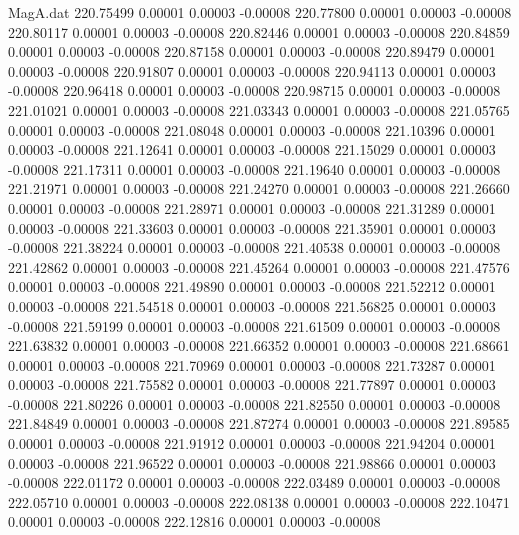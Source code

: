 \begin{filecontents}{MagA.dat}
 220.75499    0.00001    0.00003   -0.00008
 220.77800    0.00001    0.00003   -0.00008
 220.80117    0.00001    0.00003   -0.00008
 220.82446    0.00001    0.00003   -0.00008
 220.84859    0.00001    0.00003   -0.00008
 220.87158    0.00001    0.00003   -0.00008
 220.89479    0.00001    0.00003   -0.00008
 220.91807    0.00001    0.00003   -0.00008
 220.94113    0.00001    0.00003   -0.00008
 220.96418    0.00001    0.00003   -0.00008
 220.98715    0.00001    0.00003   -0.00008
 221.01021    0.00001    0.00003   -0.00008
 221.03343    0.00001    0.00003   -0.00008
 221.05765    0.00001    0.00003   -0.00008
 221.08048    0.00001    0.00003   -0.00008
 221.10396    0.00001    0.00003   -0.00008
 221.12641    0.00001    0.00003   -0.00008
 221.15029    0.00001    0.00003   -0.00008
 221.17311    0.00001    0.00003   -0.00008
 221.19640    0.00001    0.00003   -0.00008
 221.21971    0.00001    0.00003   -0.00008
 221.24270    0.00001    0.00003   -0.00008
 221.26660    0.00001    0.00003   -0.00008
 221.28971    0.00001    0.00003   -0.00008
 221.31289    0.00001    0.00003   -0.00008
 221.33603    0.00001    0.00003   -0.00008
 221.35901    0.00001    0.00003   -0.00008
 221.38224    0.00001    0.00003   -0.00008
 221.40538    0.00001    0.00003   -0.00008
 221.42862    0.00001    0.00003   -0.00008
 221.45264    0.00001    0.00003   -0.00008
 221.47576    0.00001    0.00003   -0.00008
 221.49890    0.00001    0.00003   -0.00008
 221.52212    0.00001    0.00003   -0.00008
 221.54518    0.00001    0.00003   -0.00008
 221.56825    0.00001    0.00003   -0.00008
 221.59199    0.00001    0.00003   -0.00008
 221.61509    0.00001    0.00003   -0.00008
 221.63832    0.00001    0.00003   -0.00008
 221.66352    0.00001    0.00003   -0.00008
 221.68661    0.00001    0.00003   -0.00008
 221.70969    0.00001    0.00003   -0.00008
 221.73287    0.00001    0.00003   -0.00008
 221.75582    0.00001    0.00003   -0.00008
 221.77897    0.00001    0.00003   -0.00008
 221.80226    0.00001    0.00003   -0.00008
 221.82550    0.00001    0.00003   -0.00008
 221.84849    0.00001    0.00003   -0.00008
 221.87274    0.00001    0.00003   -0.00008
 221.89585    0.00001    0.00003   -0.00008
 221.91912    0.00001    0.00003   -0.00008
 221.94204    0.00001    0.00003   -0.00008
 221.96522    0.00001    0.00003   -0.00008
 221.98866    0.00001    0.00003   -0.00008
 222.01172    0.00001    0.00003   -0.00008
 222.03489    0.00001    0.00003   -0.00008
 222.05710    0.00001    0.00003   -0.00008
 222.08138    0.00001    0.00003   -0.00008
 222.10471    0.00001    0.00003   -0.00008
 222.12816    0.00001    0.00003   -0.00008

\end{filecontents}
